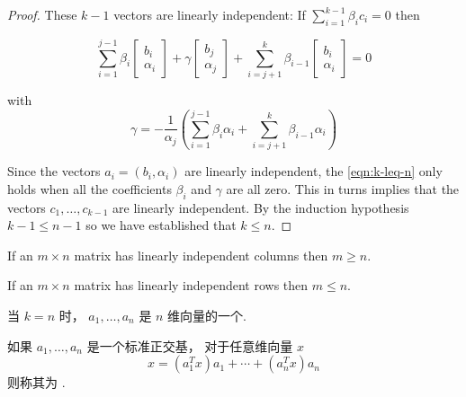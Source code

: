 \begin{proof}
     These $ k-1 $ vectors are linearly independent: If $ \sum_{i=1}^{k-1} \beta_{i} c_{i}=0 $ then

    \begin{equation}
        \label{eqn:k-leq-n}
        \sum_{i=1}^{j-1} \beta_{i}\left[\begin{array}{c}
        b_{i} \\
        \alpha_{i}
        \end{array}\right]+\gamma\left[\begin{array}{c}
        b_{j} \\
        \alpha_{j}
        \end{array}\right]+\sum_{i=j+1}^{k} \beta_{i-1}\left[\begin{array}{c}
        b_{i} \\
        \alpha_{i}
        \end{array}\right]=0
    \end{equation}

    with
    \begin{equation}
    \gamma=-\frac{1}{\alpha_{j}}\left(\sum_{i=1}^{j-1} \beta_{i} \alpha_{i}+\sum_{i=j+1}^{k} \beta_{i-1} \alpha_{i}\right)
    \end{equation}

    Since the vectors $ a_{i}=\left(b_{i}, \alpha_{i}\right) $ are linearly independent, the \cref{eqn:k-leq-n} only holds when all the coefficients $ \beta_{i} $ and $ \gamma $ are all zero. This in turns implies that the vectors $ c_{1}, \ldots, c_{k-1} $ are linearly independent. By the induction hypothesis $ k-1 \leq n-1 $ so we have established that $ k \leq n $.
\end{proof}

\begin{corollary}
    If an $ m \times n $ matrix has linearly independent columns then $ m \geq n $. 
\end{corollary}

\begin{corollary}
    If an $ m \times n $ matrix has linearly independent rows then $ m \leq n $.
\end{corollary}

\begin{definition}[$n$维向量的一个标准正交基]
    当 $ k=n $ 时，  $ a_{1}, \ldots, a_{n} $ 是 $ n $ 维向量的一个. 
\end{definition}

\begin{definition}[ $ x $ 在标准正交基下的标准正交分解]
    如果 $ a_{1}, \ldots, a_{n} $ 是一个标准正交基， 对于任意维向量 $ x $
\begin{equation}
x=\left(a_{1}^{T} x\right) a_{1}+\cdots+\left(a_{n}^{T} x\right) a_{n}
\end{equation}
则称其为 . 
\end{definition}

